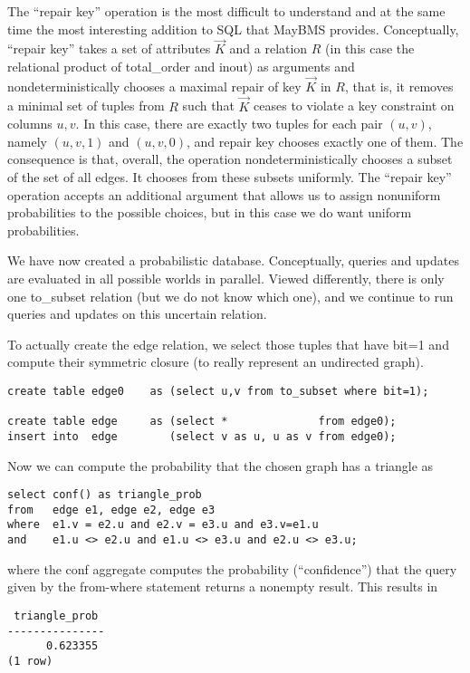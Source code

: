 The ``repair key'' operation is the most difficult to understand and
at the same time the most interesting addition to SQL that MayBMS provides.
Conceptually, ``repair key'' takes a set of attributes $\vec{K}$
and a relation $R$ (in this case the relational
product of total\_order and inout)
as arguments and nondeterministically chooses a maximal repair
of key $\vec{K}$ in $R$, that is, it removes a minimal set of tuples from
$R$ such that $\vec{K}$ ceases to violate a key constraint on columns $u, v$.
In this case, there are exactly two tuples for each pair $(u,v)$, namely
$(u,v,1)$ and $(u,v,0)$, and repair key chooses exactly one of them.
The consequence is that, overall, the operation nondeterministically
chooses a subset of the set of all edges. It chooses from these subsets
uniformly. The ``repair key'' operation accepts an additional argument that
allows us to assign nonuniform probabilities to the possible choices, but
in this case we do want uniform probabilities.

We have now created a probabilistic database. Conceptually, queries
and updates are evaluated in all possible worlds in parallel. Viewed differently, there is only one to\_subset relation (but we do not know which one), and
we continue to run queries and updates on this uncertain relation.

To actually create the edge relation, we select those tuples that have
bit=1 and compute their symmetric closure (to really represent an undirected
graph).
%
\begin{verbatim}
create table edge0    as (select u,v from to_subset where bit=1);

create table edge     as (select *              from edge0);
insert into  edge        (select v as u, u as v from edge0);
\end{verbatim}

Now we can compute the probability that the chosen graph has a triangle
as
%
\begin{verbatim}
select conf() as triangle_prob
from   edge e1, edge e2, edge e3
where  e1.v = e2.u and e2.v = e3.u and e3.v=e1.u
and    e1.u <> e2.u and e1.u <> e3.u and e2.u <> e3.u;
\end{verbatim}
where the conf aggregate computes the probability (``confidence'') that
the query given by the from-where statement returns a nonempty result.
This results in
%
\begin{verbatim}
 triangle_prob
---------------
      0.623355
(1 row)
\end{verbatim}

